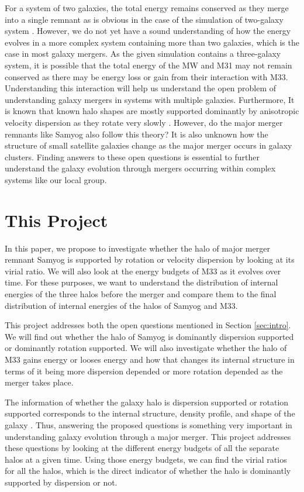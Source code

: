\documentclass[twocolumn]{aastex631}
\begin{document}
For a system of two galaxies, the total energy remains conserved as they merge into a single remnant as is obvious in the case of the simulation of two-galaxy system \citep{same_mass_merger_1}. However, we do not yet have a sound understanding of how the energy evolves in a more complex system containing more than two galaxies, which is the case in most galaxy mergers. As the given simulation contains a three-galaxy system, it is possible that the total energy of the MW and M31 may not remain conserved as there may be energy loss or gain from their interaction with M33. Understanding this interaction will help us understand the open problem of understanding galaxy mergers in systems with multiple galaxies. Furthermore, It is known that known halo shapes are mostly supported dominantly by anisotropic velocity dispersion as they rotate very slowly \citep{spin_param_explain}. However, do the major merger remnants like Samyog also follow this theory? It is also unknown how the structure of small satellite galaxies change as the major merger occurs in galaxy clusters. Finding answers to these open questions is essential to further understand the galaxy evolution through mergers occurring within complex systems like our local group.


\section{This Project}
\label{sec:proj}

In this paper, we propose to investigate whether the halo of major merger remnant Samyog is supported by rotation or velocity dispersion by looking at its virial ratio. We will also look at the energy budgets of M33 as it evolves over time. For these purposes, we want to understand the distribution of internal energies of the three halos before the merger and compare them to the final distribution of internal energies of the halos of Samyog and M33. 

This project addresses both the open questions mentioned in Section \ref{sec:intro}. We will find out whether the halo of Samyog is dominantly dispersion supported or dominantly rotation supported. We will also investigate whether the halo of M33 gains energy or looses energy and how that changes its internal structure in terms of it being more dispersion depended or more rotation depended as the merger takes place.

The information of whether the galaxy halo is dispersion supported or rotation supported corresponds to the internal structure, density profile, and shape of the galaxy \citep{same_mass_merger_1, same_mass_merger_2}. Thus, answering the proposed questions is something very important in understanding galaxy evolution through a major merger. This project addresses these questions by looking at the different energy budgets of all the separate halos at a given time. Using those energy budgets, we can find the virial ratios for all the halos, which is the direct indicator of whether the halo is dominantly supported by dispersion or not.   
\end{document}
